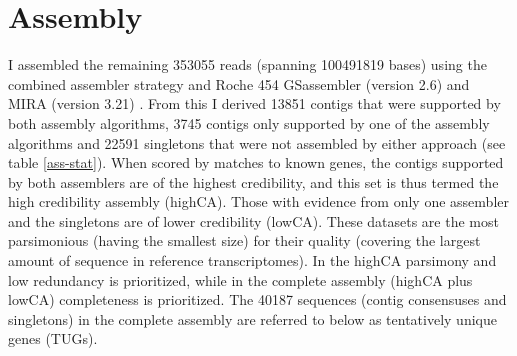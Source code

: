 \afterpage{\clearpage}

\section{Assembly}


I assembled the remaining 353055 reads (spanning 100491819 bases)
using the combined assembler strategy \cite{pmid20950480} and Roche
454 GSassembler (version 2.6) and MIRA (version 3.21)
\cite{miraEST}. From this I derived 13851 contigs that were supported
by both assembly algorithms, 3745 contigs only supported by one of the
assembly algorithms and 22591 singletons that were not assembled by
either approach (see table \ref{ass-stat}). When scored by matches to
known genes, the contigs supported by both assemblers are of the
highest credibility, and this set is thus termed the high credibility
assembly (highCA). Those with evidence from only one assembler and the
singletons are of lower credibility (lowCA). These datasets are the
most parsimonious (having the smallest size) for their quality
(covering the largest amount of sequence in reference
transcriptomes). In the highCA parsimony and low redundancy is
prioritized, while in the complete assembly (highCA plus lowCA)
completeness is prioritized. The 40187 sequences (contig consensuses
and singletons) in the complete assembly are referred to below as
tentatively unique genes (TUGs).

